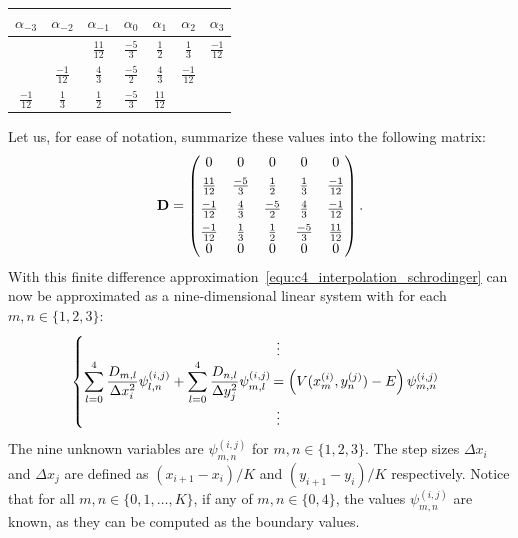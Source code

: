 \begin{center}
    \begin{tabular}{@{}ccc|c|ccc@{}}
        $\alpha_{-3}$                      & $\alpha_{-2}$   & $\alpha_{-1}$   & $\alpha_{0}$   & $\alpha_{1}$    & $\alpha_{2}$    & $\alpha_{3}$    \\ \hline
        \rule{0pt}{3ex}                    &                 & $\frac{11}{12}$ & $\frac{-5}{3}$ & $\frac{1}{2}$   & $\frac{1}{3}$   & $\frac{-1}{12}$ \\
        \rule{0pt}{3ex}                    & $\frac{-1}{12}$ & $\frac{4}{3}$   & $\frac{-5}{2}$ & $\frac{4}{3}$   & $\frac{-1}{12}$ &                 \\
        \rule{0pt}{3ex}    $\frac{-1}{12}$ & $\frac{1}{3}$   & $\frac{1}{2}$   & $\frac{-5}{3}$ & $\frac{11}{12}$ &                 &
    \end{tabular}
\end{center}

Let us, for ease of notation, summarize these values into the following matrix:
$$
    \vb{D} = \begin{pmatrix}
        0                             & 0            & 0            & 0            & 0             \\
        \rule{0pt}{3ex} \frac{11}{12} & \frac{-5}{3} & \frac{1}{2}  & \frac{1}{3}  & \frac{-1}{12} \\
        \rule{0pt}{3ex} \frac{-1}{12} & \frac{4}{3}  & \frac{-5}{2} & \frac{4}{3}  & \frac{-1}{12} \\
        \rule{0pt}{3ex} \frac{-1}{12} & \frac{1}{3}  & \frac{1}{2}  & \frac{-5}{3} & \frac{11}{12} \\
        0                             & 0            & 0            & 0            & 0
    \end{pmatrix}\text{.}
$$
With this finite difference approximation~\eqref{equ:c4_interpolation_schrodinger} can now be approximated as a nine-dimensional linear system with for each $m, n \in \{1,2,3\}$:
$$
    \left\{\begin{array}{@{}r@{}l}
                                                                                                                                                      & \,\:\vdots                                                                       \\
        {\displaystyle \sum_{l=0}^4 \frac{D_{m, l}}{\Delta x_i^2}\psi^{(i,j)}_{l, n} + \sum_{l=0}^4 \frac{D_{n, l}}{\Delta y_j^2}\psi^{(i,j)}_{m, l}} & \,{\displaystyle =  \left(V(x^{(i)}_m, y^{(j)}_n) - E\right)\psi^{(i,j)}_{m, n}} \\
                                                                                                                                                      & \,\:\vdots
    \end{array}\right.
$$
The nine unknown variables are $\psi^{(i, j)}_{m, n}$ for $m, n \in \{1,2,3\}$. The step sizes $\Delta x_i$ and $\Delta x_j$ are defined as $\left(x_{i+1} - x_{i}\right) / K$ and $\left(y_{i+1} - y_{i}\right) / K$ respectively. Notice that for all $m, n \in \{0,1,\dots, K\}$, if any of $m, n \in \{0, 4\}$, the values $\psi^{(i, j)}_{m, n}$ are known, as they can be computed as the boundary values.

